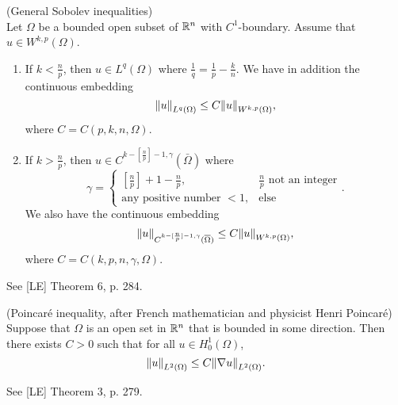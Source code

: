 \documentclass[11pt]{article}
\begin{document}
    		\begin{thm}(General Sobolev inequalities)\\
    			Let $\Omega$ be a bounded open subset of $\mathbb{R}^n$ with $C^1$-boundary. Assume that $u\in W^{k,p}(\Omega)$.
    			\begin{enumerate}
    				\item If $k<\frac{n}{p}$, then $u\in L^q(\Omega)$ where $\frac{1}{q}=\frac{1}{p}-\frac{k}{n}$. We have in addition the continuous embedding 
    				\begin{equation*}
    					\norm{u}_{L^q(\Omega)}\le C\norm{u}_{W^{k,p}(\Omega)},
    				\end{equation*}
    				where $C=C(p,k,n,\Omega)$.
    				\item If $k>\frac{n}{p}$, then $u\in C^{k-[\frac{n}{p}]-1,\gamma}(\bar{\Omega})$ where
    				\begin{equation*}
    					\gamma=\begin{cases}
    						\left[\frac{n}{p}\right]+1-\frac{n}{p}, & \frac{n}{p}\text{ not an integer}\\
    						\text{any positive number }<1, & \text{else}
    					\end{cases}.
    				\end{equation*}
    				We also have the continuous embedding 
    				\begin{equation*}
    					\norm{u}_{C^{k-[\frac{n}{p}]-1,\gamma}(\overline{\Omega})}\le C\norm{u}_{W^{k,p}(\Omega)},
    				\end{equation*}
    				where $C=C(k,p,n,\gamma,\Omega)$. 
    			\end{enumerate}
    		\end{thm}
    		\begin{pproof}
    			See [LE] Theorem 6, p. 284.
    		\end{pproof}
    
    		\begin{thm}\label{thm--Poincare}(Poincar{\'e} inequality, after French mathematician and physicist Henri Poincar\'e)\\
    			Suppose that $\Omega$ is an open set in $\mathbb{R}^n$ that is bounded in some direction. Then there exists $C>0$ such that for all $u\in H^1_0(\Omega)$,
    			\begin{equation*}
    				\norm{u}_{L^2(\Omega)}\le C\norm{\nabla u}_{L^2(\Omega)}.
    			\end{equation*}
    		\end{thm}
    		\begin{pproof}
    			See [LE] Theorem 3, p. 279.
    		\end{pproof}
    		
\end{document}
